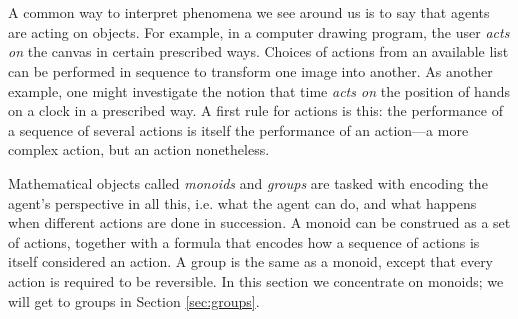 

\section{}\label{sec:monoids}

\begin{blockENG}
A common way to interpret phenomena we see around us is to say that agents are acting on objects. For example, in a computer drawing program, the user {\em acts on} the canvas in certain prescribed ways. Choices of actions from an available list can be performed in sequence to transform one image into another. As another example, one might investigate the notion that time {\em acts on} the position of hands on a clock in a prescribed way. A first rule for actions is this: the performance of a sequence of several actions is itself the performance of an action—a more complex action, but an action nonetheless.
\end{blockENG}

\begin{blockRUS}
\end{blockRUS}

\begin{blockENG}
Mathematical objects called {\em monoids} and {\em groups} are tasked with encoding the agent's perspective in all this, i.e. what the agent can do, and what happens when different actions are done in succession. A monoid can be construed as a set of actions, together with a formula that encodes how a sequence of actions is itself considered an action. A group is the same as a monoid, except that every action is required to be reversible. In this section we concentrate on monoids; we will get to groups in Section \ref{sec:groups}.
\end{blockENG}


\subsection{}

